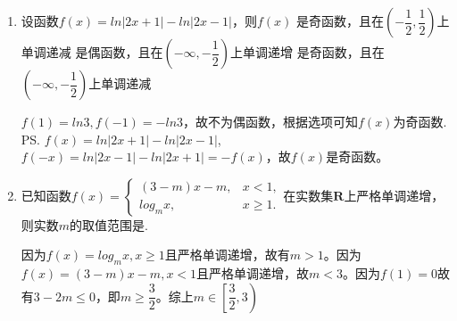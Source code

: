 \begin{enumerate}
    \item 设函数$f(x) = ln|2x+1| - ln|2x-1|$，则$f(x)$
    {是奇函数，且在$\left(-\dfrac{1}{2}, \dfrac{1}{2}\right)$上单调递减}
    {是偶函数，且在$\left(-\infty, -\dfrac{1}{2}\right)$上单调递增}
    {是奇函数，且在$\left(-\infty, -\dfrac{1}{2}\right)$上单调递减}
    \begin{jieda}
        $f(1) = ln3, f(-1) = -ln3$，故不为偶函数，根据选项可知$f(x)$为奇函数. \\
        \ps $f(x) = ln|2x+1| - ln|2x-1|$, $f(-x) = ln|2x-1| - ln|2x+1| = -f(x)$，故$f(x)$是奇函数。
    \end{jieda}
    \item 已知函数$f(x) = \left\{  
         \begin{array}{ll}  
            (3-m)x-m, & x < 1, \\  
            log_mx, & x \geq 1.
         \end{array}
    \right.$在实数集$\mathbf{R}$上严格单调递增，则实数$m$的取值范围是\blkda{$\left[\dfrac{3}{2},3\right)$}.
    \begin{jieda}
        因为$f(x) = log_mx, x \geq 1$且严格单调递增，故有$m > 1$。因为$f(x) = (3-m)x-m, x< 1$且严格单调递增，故$m < 3$。因为$f(1) = 0$故有$3-2m \leq 0$，即$m \geq \dfrac{3}{2}$。综上$m \in \left[\dfrac{3}{2},3\right)$


\end{jieda}
\end{enumerate}
